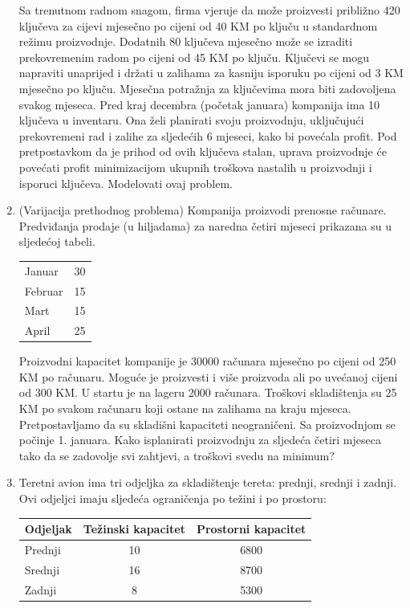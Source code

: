 \documentclass[b5paper, utf8, 11pt, colorlinks]{book}
\theoremstyle{definition}
\begin{document}
\begin{enumerate}
	Sa trenutnom radnom snagom, firma vjeruje da može proizvesti približno 420 ključeva za cijevi mjesečno po cijeni od 40 KM po ključu u standardnom režimu proizvodnje. Dodatnih 80 ključeva mjesečno može se izraditi prekovremenim radom po cijeni od 45 KM po ključu.
	Ključevi se mogu napraviti unaprijed i držati u zalihama za kasniju isporuku po cijeni od 3 KM mjesečno po ključu. Mjesečna potražnja za ključevima mora biti zadovoljena svakog mjeseca. Pred kraj decembra (početak januara) kompanija ima 10 ključeva u inventaru. Ona želi planirati svoju proizvodnju, uključujući prekovremeni rad i zalihe za sljedećih 6 mjeseci, kako bi povećala profit. Pod pretpostavkom da je prihod od ovih ključeva stalan, uprava proizvodnje  će povećati  profit minimizacijom ukupnih troškova nastalih u proizvodnji i isporuci ključeva. Modelovati ovaj problem.
	\item %
	(Varijacija prethodnog problema) Kompanija proizvodi prenosne računare. Predviđanja prodaje (u hiljadama) za naredna četiri mjeseci prikazana su u sljedećoj tabeli. 
\begin{center}
	\begin{tabular}{lc}\hline
		Januar  & 30 \\
		Februar & 15 \\
		Mart    & 15 \\
		April   & 25 \\
		\hline
	\end{tabular}  
\end{center}	
	
	Proizvodni kapacitet kompanije je 30000 računara mjesečno po cijeni od 250 KM po računaru. Moguće je proizvesti i više proizvoda ali po uvećanoj cijeni od 300 KM. U startu je na lageru 2000 računara. Troškovi skladištenja su 25 KM po svakom računaru koji ostane na zalihama na kraju mjeseca. Pretpostavljamo da su skladišni kapaciteti neograničeni. Sa proizvodnjom se počinje 1. januara. Kako isplanirati proizvodnju za sljedeća četiri mjeseca tako da se zadovolje svi zahtjevi, a troškovi svedu na minimum?
	\item Teretni avion ima tri odjeljka za skladištenje tereta: prednji, srednji i zadnji. Ovi odjeljci imaju sljedeća ograničenja po težini i po prostoru: 
\begin{table}[!ht]
	\centering
	\begin{tabular}{lcc}
	   Odjeljak   & Težinski kapacitet & Prostorni kapacitet \\ \hline
	   Prednji    & 10                 & 6800                 \\ 
	   Srednji  & 16                 & 8700                 \\
	   Zadnji   &  8                 & 5300                 \\ \hline
 	\end{tabular}
\end{table}
	

\end{enumerate}
\end{document}
